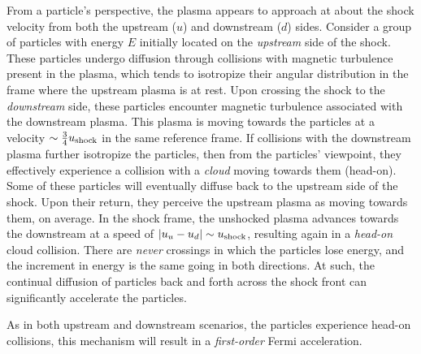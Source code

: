 From a particle's perspective, the plasma appears to approach at about the shock velocity from both the upstream (\( u \)) and downstream (\( d \)) sides. 
%
Consider a group of particles with energy \( E \) initially located on the \emph{upstream} side of the shock. These particles undergo diffusion through collisions with magnetic turbulence present in the plasma, which tends to isotropize their angular distribution in the frame where the upstream plasma is at rest.
%
Upon crossing the shock to the \emph{downstream} side, these particles encounter magnetic turbulence associated with the downstream plasma. This plasma is moving towards the particles at a velocity \( \sim \frac{3}{4} u_{\rm shock} \) in the same reference frame. If collisions with the downstream plasma further isotropize the particles, then from the particles' viewpoint, they effectively experience a collision with a \emph{cloud} moving towards them (head-on). 
%
Some of these particles will eventually diffuse back to the upstream side of the shock. Upon their return, they perceive the upstream plasma as moving towards them, on average. In the shock frame, the unshocked plasma advances towards the downstream at a speed of \( |u_u - u_d| \sim u_{\rm shock} \), resulting again in a \emph{head-on} cloud collision.
%
There are \emph{never} crossings in which the particles lose energy, and the increment in energy is the same going in both directions. At such, the continual diffusion of particles back and forth across the shock front can significantly accelerate the particles. 

As in both upstream and downstream scenarios, the particles experience head-on collisions, this mechanism will result in a \emph{first-order} Fermi acceleration.


